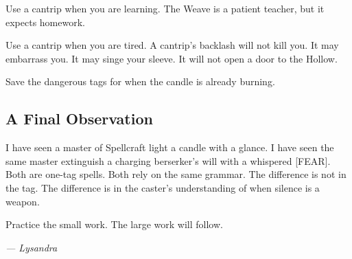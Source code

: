 Use a cantrip when you are learning. The Weave is a patient teacher, but it expects homework.

Use a cantrip when you are tired. A cantrip's backlash will not kill you. It may embarrass you. It may singe your sleeve. It will not open a door to the Hollow.

Save the dangerous tags for when the candle is already burning.

\subsection{A Final Observation}

I have seen a master of Spellcraft light a candle with a glance. I have seen the same master extinguish a charging berserker's will with a whispered [FEAR]. Both are one-tag spells. Both rely on the same grammar. The difference is not in the tag. The difference is in the caster's understanding of when silence is a weapon.

Practice the small work. The large work will follow.

\textit{--- Lysandra}
